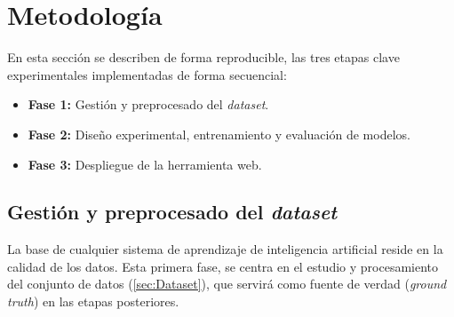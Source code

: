 \documentclass[12pt,a4paper,onecolumn,oneside]{report}
\begin{document}
\chapter{Metodología} %
\label{metodologia}

En esta sección se describen de forma reproducible, las tres etapas clave experimentales implementadas de forma secuencial: 
\begin{itemize}
  \item \textbf{Fase 1:} Gestión y preprocesado del \textit{dataset}.
  \item \textbf{Fase 2:} Diseño experimental, entrenamiento y evaluación de modelos.
  \item \textbf{Fase 3:} Despliegue de la herramienta web.
\end{itemize}

\section{Gestión y preprocesado del \textit{dataset}}
\label{Gestión y preprocesado del dataset}

La base de cualquier sistema de aprendizaje de inteligencia artificial reside en la calidad de los datos. Esta primera fase, se centra en el estudio y procesamiento del conjunto de datos (\autoref{sec:Dataset}), que servirá como
fuente de verdad (\textit{ground truth}) en las etapas posteriores.
\end{document}
